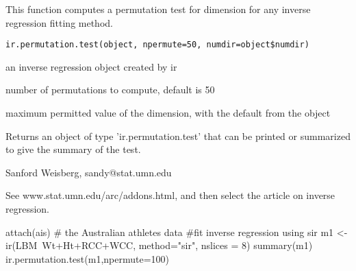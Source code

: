 \documentclass[letterpaper]{book}
\begin{document}
\begin{Description}\relax
This function computes a permutation test for dimension for any inverse 
regression fitting method.\end{Description}
\begin{Usage}
\begin{verbatim}
ir.permutation.test(object, npermute=50, numdir=object$numdir)
\end{verbatim}
\end{Usage}
\begin{Arguments}
\begin{ldescription}
\item[\code{object}] an inverse regression object created by ir
\item[\code{npermute}] number of permutations to compute, default is 50
\item[\code{numdir}] maximum permitted value of the dimension, with the default from
the object
\end{ldescription}
\end{Arguments}
\begin{Value}
Returns an object of type 'ir.permutation.test' that can be printed or
summarized to give the summary of the test.\end{Value}
\begin{Author}\relax
Sanford Weisberg, sandy@stat.umn.edu\end{Author}
\begin{References}\relax
See www.stat.umn.edu/arc/addons.html, and then select the article
on inverse regression.\end{References}
\begin{SeeAlso}\relax
{}\end{SeeAlso}
\begin{Examples}
\begin{ExampleCode}
attach(ais)  # the Australian athletes data
#fit inverse regression using sir
m1 <- ir(LBM~Wt+Ht+RCC+WCC, method="sir", nslices = 8)
summary(m1)
ir.permutation.test(m1,npermute=100)
\end{ExampleCode}
\end{Examples}
\end{document}

